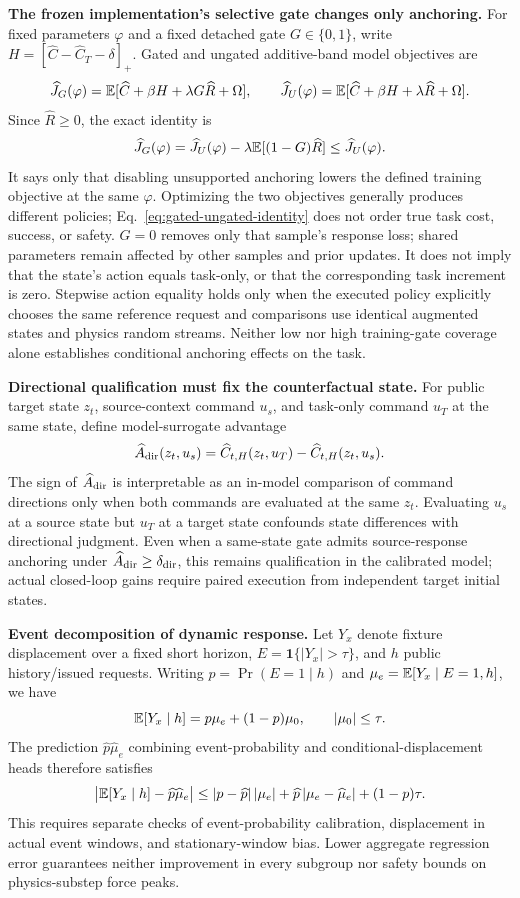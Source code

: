 \textbf{The frozen implementation's selective gate changes only anchoring.}
For fixed parameters $\varphi$ and a fixed detached gate $G\in\{0,1\}$, write
$H=[\widehat C-\widehat C_T-\delta]_+$. Gated and ungated additive-band
model objectives are
\[
 \widehat J_G(\varphi)=\mathbb E[\widehat C+\beta H+\lambda G\widehat R+\Omega],
 \qquad
 \widehat J_U(\varphi)=\mathbb E[\widehat C+\beta H+\lambda\widehat R+\Omega].
\]
Since $\widehat R\ge0$, the exact identity is
\begin{equation}
 \widehat J_G(\varphi)=\widehat J_U(\varphi)
 -\lambda\mathbb E[(1-G)\widehat R]\le \widehat J_U(\varphi).
 \label{eq:gated-ungated-identity}
\end{equation}
It says only that disabling unsupported anchoring lowers the defined training objective at the same $\varphi$.
Optimizing the two objectives generally produces different policies; Eq.~\eqref{eq:gated-ungated-identity} does not order
true task cost, success, or safety. $G=0$ removes only that sample's response loss;
shared parameters remain affected by other samples and prior updates. It does not imply that the state's action equals task-only,
or that the corresponding task increment is zero. Stepwise action equality holds only when the executed policy explicitly chooses the same reference request
and comparisons use identical augmented states and physics random streams.
Neither low nor high training-gate coverage alone establishes conditional anchoring effects on the task.

\textbf{Directional qualification must fix the counterfactual state.} For public target state $z_t$, source-context command
$u_s$, and task-only command $u_T$ at the same state, define model-surrogate advantage
\[
 \widehat A_{\rm dir}(z_t,u_s)
 =\widehat C_{t,H}(z_t,u_T)-\widehat C_{t,H}(z_t,u_s).
\]
The sign of $\widehat A_{\rm dir}$ is interpretable as an in-model comparison of command directions only when both commands
are evaluated at the same $z_t$. Evaluating $u_s$ at a source state but $u_T$ at a target state confounds
state differences with directional judgment. Even when a same-state gate admits source-response anchoring under
$\widehat A_{\rm dir}\ge\delta_{\rm dir}$, this remains qualification in the calibrated model;
actual closed-loop gains require paired execution from independent target initial states.

\textbf{Event decomposition of dynamic response.} Let $Y_x$ denote fixture displacement over a fixed short horizon,
$E=\mathbf 1\{|Y_x|>\tau\}$, and $h$ public history/issued requests. Writing
$p=\Pr(E=1\mid h)$ and $\mu_e=\mathbb E[Y_x\mid E=1,h]$, we have
\[
 \mathbb E[Y_x\mid h]=p\mu_e+(1-p)\mu_0,
 \qquad |\mu_0|\le\tau.
\]
The prediction $\widehat p\widehat\mu_e$ combining event-probability and conditional-displacement heads therefore satisfies
\[
 \big|\mathbb E[Y_x\mid h]-\widehat p\widehat\mu_e\big|
 \le |p-\widehat p|\,|\mu_e|
   +\widehat p\,|\mu_e-\widehat\mu_e|+(1-p)\tau.
\]
This requires separate checks of event-probability calibration, displacement in actual event windows, and stationary-window bias.
Lower aggregate regression error guarantees neither improvement in every subgroup nor safety bounds on physics-substep force peaks.

